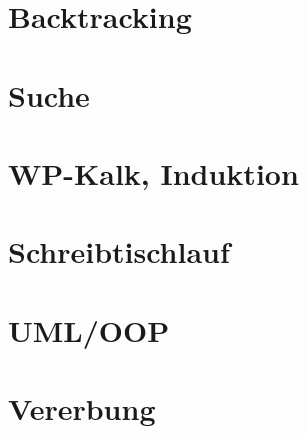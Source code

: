 \documentclass{article}
\begin{document}
	\section{Backtracking}
	\section{Suche}
	\section{WP-Kalk, Induktion}
	\section{Schreibtischlauf}
	\section{UML/OOP}
	\section{Vererbung}
\end{document}
